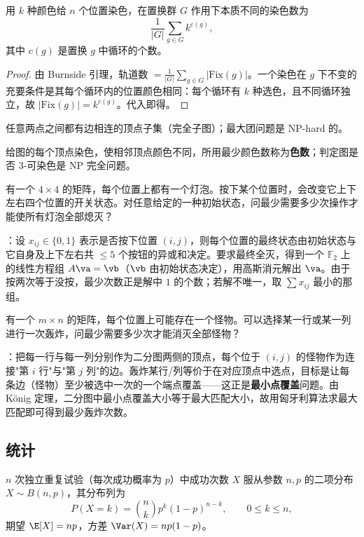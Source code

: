\documentclass[12pt]{article}
\begin{document}
\begin{thm}
  用 $k$ 种颜色给 $n$ 个位置染色，在置换群 $G$ 作用下本质不同的染色数为
  \[
    \frac{1}{|G|}\sum_{g\in G} k^{c(g)},
  \]
  其中 $c(g)$ 是置换 $g$ 中循环的个数。
\end{thm}
\begin{proof}
  由 Burnside 引理，轨道数 $=\frac1{|G|}\sum_{g\in G}|\text{Fix}(g)|$。一个染色在 $g$ 下不变的充要条件是其每个循环内的位置颜色相同：每个循环有 $k$ 种选色，且不同循环独立，故 $|\text{Fix}(g)|=k^{c(g)}$。代入即得。
\end{proof}

\begin{defn}[团（clique）]
  任意两点之间都有边相连的顶点子集（完全子图）；最大团问题是 NP-hard 的。
\end{defn}

\begin{defn}[染色问题]
  给图的每个顶点染色，使相邻顶点颜色不同，所用最少颜色数称为\textbf{色数}；判定图是否 3-可染色是 NP 完全问题。
\end{defn}
\begin{exam}
  有一个 $4\times 4$ 的矩阵，每个位置上都有一个灯泡。按下某个位置时，会改变它上下左右四个位置的开关状态。对任意给定的一种初始状态，问最少需要多少次操作才能使所有灯泡全部熄灭？

  ：设 $x_{ij}\in\{0,1\}$ 表示是否按下位置 $(i,j)$，则每个位置的最终状态由初始状态与它自身及上下左右共 $\le 5$ 个按钮的异或和决定。要求最终全灭，得到一个 $\mathbb{F}_2$ 上的线性方程组 $A\va=\vb$（$\vb$ 由初始状态决定），用高斯消元解出 $\va$。由于按两次等于没按，最少次数正是解中 $1$ 的个数；若解不唯一，取 $\sum x_{ij}$ 最小的那组。

  有一个 $m\times n$ 的矩阵，每个位置上可能存在一个怪物。可以选择某一行或某一列进行一次轰炸，问最少需要多少次才能消灭全部怪物？

  ：把每一行与每一列分别作为二分图两侧的顶点，每个位于 $(i,j)$ 的怪物作为连接"第 $i$ 行"与"第 $j$ 列"的边。轰炸某行/列等价于在对应顶点中选点，目标是让每条边（怪物）至少被选中一次的一个端点覆盖——这正是\textbf{最小点覆盖}问题。由 König 定理，二分图中最小点覆盖大小等于最大匹配大小，故用匈牙利算法求最大匹配即可得到最少轰炸次数。
\end{exam}
\subsection{统计}
\begin{defn}
  $n$ 次独立重复试验（每次成功概率为 $p$）中成功次数 $X$ 服从参数 $n,p$ 的二项分布 $X\sim B(n,p)$，其分布列为
  \[
    P(X=k)=\binom{n}{k}p^k(1-p)^{n-k},\qquad 0\le k\le n,
  \]
  期望 $\E[X]=np$，方差 $\Var(X)=np(1-p)$。
\end{defn}
\end{document}
